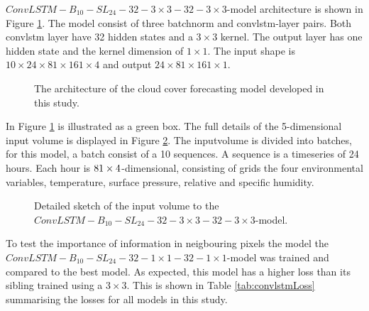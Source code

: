 $ConvLSTM-B_{10}-SL_{24}-32-3\times3-32-3 \times3$-model architecture is shown in Figure \ref{fig:best_ml_architecture}. The model consist of three \acrshort{batchnorm} and  \acrshort{convlstm}-layer pairs. Both \acrshort{convlstm} layer have 32 hidden states and a $3\times 3$ kernel. The output layer has one hidden state and the kernel dimension of $1\times 1$. The input shape is $10\times24\times81\times161\times4$ and output $24\times81\times161\times1$. 
\begin{figure}
    \centering
    
    \caption{The architecture of the cloud cover forecasting model developed in this study. }
    \label{fig:best_ml_architecture}
\end{figure}
In Figure \ref{fig:best_ml_architecture} is illustrated as a green box. The full details of the 5-dimensional input volume is displayed in Figure \ref{fig:input_volume_conv_lstm}. The inputvolume is divided into batches, for this model, a batch consist of a 10 sequences. A sequence is a timeseries of 24 hours. Each hour is $81\time161\times4$-dimensional, consisting of grids the four environmental variables, temperature, surface pressure, relative and specific humidity. 

\begin{figure}
    \centering
    
    \caption{Detailed sketch of the input volume to the $ConvLSTM-B_{10}-SL_{24}-32-3\times3-32-3 \times3$-model.}
    \label{fig:input_volume_conv_lstm}
\end{figure}

To test the importance of information in neigbouring pixels the model the $ConvLSTM-B_{10}-SL_{24}-32-1\times1-32-1 \times1$-model was trained and compared to the best model. %
As expected, this model has a higher loss than its sibling trained using a $3\times 3$. This is shown in Table \ref{tab:convlstmLoss} summarising the losses for all models in this study.
\clearpage

